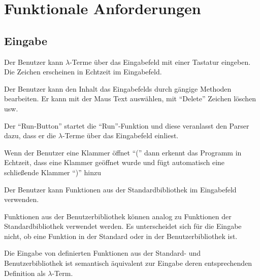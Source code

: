 \documentclass[parskip=full,11pt,twoside]{scrartcl}
\begin{document}
\section{Funktionale Anforderungen}

\subsection{Eingabe}
Der Benutzer kann $\lambda$-Terme über das Eingabefeld mit einer Tastatur eingeben. Die Zeichen erscheinen in Echtzeit im Eingabefeld.

Der Benutzer kann den Inhalt das Eingabefelds durch gängige Methoden bearbeiten.
Er kann mit der Maus Text auswählen, mit \enquote{Delete} Zeichen löschen usw.

Der \enquote{Run-Button} startet die  \enquote{Run}-Funktion und diese veranlasst den Parser dazu, dass er die $\lambda$-Terme über das Eingabefeld einliest.


Wenn der Benutzer eine Klammer öffnet \enquote{(} dann erkennt das Programm in Echtzeit, dass eine Klammer geöffnet wurde und fügt automatisch eine schließende Klammer \enquote{)} hinzu

Der Benutzer kann Funktionen aus der Standardbibliothek im Eingabefeld verwenden.

Funktionen aus der Benutzerbibliothek können analog zu Funktionen der Standardbibliothek verwendet werden. Es unterscheidet sich für die Eingabe nicht, ob eine Funktion in der Standard oder in der Benutzerbibliothek ist.


Die Eingabe von definierten Funktionen aus der Standard- und Benutzerbibliothek ist semantisch äquivalent zur Eingabe deren entsprechenden Definition als $\lambda$-Term.
\end{document}
